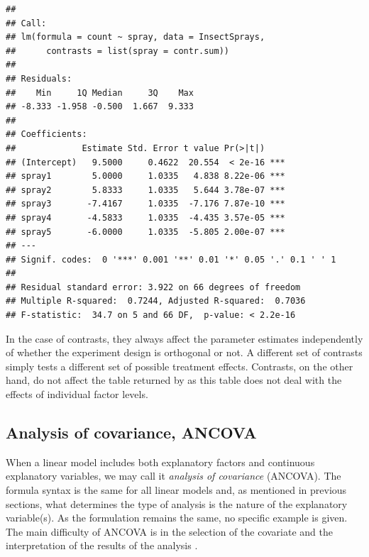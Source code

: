 \documentclass[krantz2]{krantz}\usepackage{knitr}
\begin{document}
\begin{warningbox}
\begin{knitrout}\footnotesize
{}\color{fgcolor}\begin{kframe}
\begin{alltt}
\end{alltt}
\begin{verbatim}
##
## Call:
## lm(formula = count ~ spray, data = InsectSprays, 
##      contrasts = list(spray = contr.sum))
##
## Residuals:
##    Min     1Q Median     3Q    Max
## -8.333 -1.958 -0.500  1.667  9.333
##
## Coefficients:
##             Estimate Std. Error t value Pr(>|t|)
## (Intercept)   9.5000     0.4622  20.554  < 2e-16 ***
## spray1        5.0000     1.0335   4.838 8.22e-06 ***
## spray2        5.8333     1.0335   5.644 3.78e-07 ***
## spray3       -7.4167     1.0335  -7.176 7.87e-10 ***
## spray4       -4.5833     1.0335  -4.435 3.57e-05 ***
## spray5       -6.0000     1.0335  -5.805 2.00e-07 ***
## ---
## Signif. codes:  0 '***' 0.001 '**' 0.01 '*' 0.05 '.' 0.1 ' ' 1
##
## Residual standard error: 3.922 on 66 degrees of freedom
## Multiple R-squared:  0.7244,	Adjusted R-squared:  0.7036
## F-statistic:  34.7 on 5 and 66 DF,  p-value: < 2.2e-16
\end{verbatim}
\end{kframe}
\end{knitrout}

In the case of contrasts, they always affect the parameter estimates independently of whether the experiment design is orthogonal or not. A different set of contrasts simply tests a different set of possible treatment effects. Contrasts, on the other hand, do not affect the table returned by  as this table does not deal with the effects of individual factor levels.
\end{warningbox}

\subsection{Analysis of covariance, ANCOVA}

When a linear model includes both explanatory factors and continuous explanatory variables, we may call it \emph{analysis of covariance} (ANCOVA). The formula syntax is the same for all linear models and, as mentioned in previous sections, what determines the type of analysis is the nature of the explanatory variable(s). As the formulation remains the same, no specific example is given. The main difficulty of ANCOVA is in the selection of the covariate and the interpretation of the results of the analysis \autocite[e.g.][]{Smith1957}.
\end{document}
